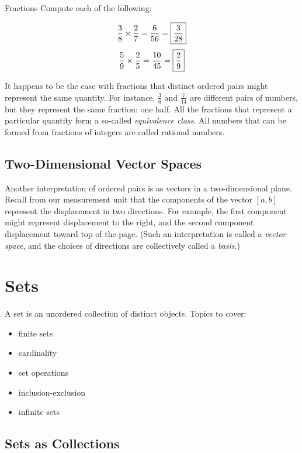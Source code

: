 \documentclass[a4paper,10pt]{report}
\begin{document}
\begin{problem}{Fractions}
 Compute each of the following:

 \[
         \frac{3}{8} \times \frac{2}{7} = \frac{6}{56} =
         \Ans{\displaystyle\frac{3}{28}}
        \]
 \[
  \frac{5}{9} \times \frac{2}{5} = \frac{10}{45} =
  \Ans{\displaystyle\frac{2}{9}}
  \]
\end{problem}

It happens to be the case with fractions that distinct ordered pairs might
represent the same quantity. For instance, \(\frac{3}{6}\) and \(\frac{7}{14}\)
are different pairs of numbers, but they represent the same fraction: one half.
All the fractions that represent a particular quantity form a so-called
\emph{equivalence class}. All numbers that can be formed from fractions of
integers are called \glspl{rational number}.

\subsection{Two-Dimensional Vector Spaces}

Another interpretation of ordered pairs is as vectors in a two-dimensional
plane. Recall from our measurement unit that the components of the vector \([a,
b]\) represent the displacement in two directions. For example, the first
component might represent displacement to the right, and the second component
displacement toward top of the page. (Such an interpretation is called a
\emph{vector space}, and the choices of directions are collectively called a
\emph{basis}.)

\section{Sets}

A set is an unordered collection of distinct objects. Topics to cover:

\begin{itemize}
  \item finite sets
  \item cardinality
  \item set operations
  \item inclusion-exclusion
  \item infinite sets
\end{itemize}

\subsection{Sets as Collections}
\end{document}
